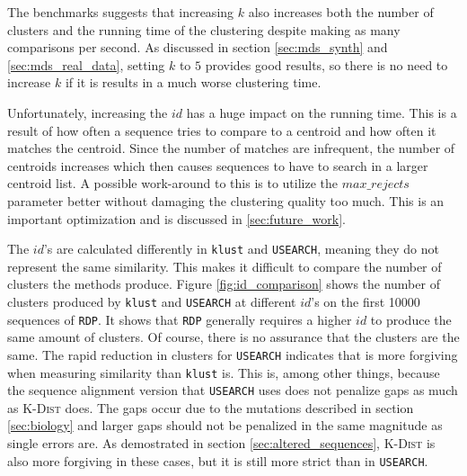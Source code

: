 The benchmarks suggests that increasing $k$ also increases both the number
of clusters and the running time of the clustering despite making as many
comparisons per second. As discussed in section \ref{sec:mds_synth} and
\ref{sec:mds_real_data}, setting $k$ to $5$ provides good results, so there is
no need to increase $k$ if it is results in a much worse clustering time.

Unfortunately, increasing the $id$ has a huge impact on the running time. This
is a result of how often a sequence tries to compare to a centroid and how
often it matches the centroid. Since the number of matches are infrequent, the
number of centroids increases which then causes sequences to have to search in
a larger centroid list. A possible work-around to this is to utilize the $max\_
rejects$ parameter better without damaging the clustering quality too much.
This is an important optimization and is discussed in
\ref{sec:future_work}.

The $id$'s are calculated differently in \texttt{klust} and \texttt{USEARCH},
meaning they do not represent the same similarity. This makes it difficult to
compare the number of clusters the methods produce. Figure
\ref{fig:id_comparison} shows the number of clusters produced by
\texttt{klust} and \texttt{USEARCH} at different $id$'s on the first
\num{10000} sequences of \texttt{RDP}. It shows that \texttt{RDP} generally
requires a higher $id$ to produce the same amount of clusters. Of course,
there is no assurance that the clusters are the same. The rapid reduction in
clusters for \texttt{USEARCH} indicates that is more forgiving when measuring
similarity than \texttt{klust} is. This is, among other things, because the
sequence alignment version that \texttt{USEARCH} uses does not penalize gaps
as much as \textsc{K-Dist} does. The gaps occur due to the mutations described
in section \ref{sec:biology} and larger gaps should not be penalized in the
same magnitude as single errors are. As demostrated in section
\ref{sec:altered_sequences}, \textsc{K-Dist} is also more forgiving in these
cases, but it is still more strict than in \texttt{USEARCH}.

